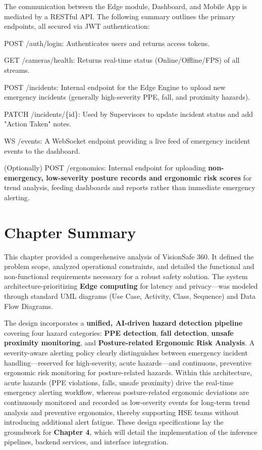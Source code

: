 The communication between the Edge module, Dashboard, and Mobile App is mediated by a RESTful API. The following summary outlines the primary endpoints, all secured via JWT authentication:

POST /auth/login: Authenticates users and returns access tokens.

GET /cameras/health: Returns real-time status (Online/Offline/FPS) of all streams.

POST /incidents: Internal endpoint for the Edge Engine to upload new emergency incidents (generally high-severity PPE, fall, and proximity hazards).

PATCH /incidents/\{id\}: Used by Supervisors to update incident status and add "Action Taken" notes.

WS /events: A WebSocket endpoint providing a live feed of emergency incident events to the dashboard.

(Optionally) POST /ergonomics: Internal endpoint for uploading \textbf{non-emergency, low-severity posture records and ergonomic risk scores} for trend analysis, feeding dashboards and reports rather than immediate emergency alerting.

\section{Chapter Summary}

This chapter provided a comprehensive analysis of VisionSafe 360. It defined the problem scope, analyzed operational constraints, and detailed the functional and non-functional requirements necessary for a robust safety solution. The system architecture-prioritizing \textbf{Edge computing} for latency and privacy—was modeled through standard UML diagrams (Use Case, Activity, Class, Sequence) and Data Flow Diagrams.

The design incorporates a \textbf{unified, AI-driven hazard detection pipeline} covering four hazard categories: \textbf{PPE detection}, \textbf{fall detection}, \textbf{unsafe proximity monitoring}, and \textbf{Posture-related Ergonomic Risk Analysis}. A severity-aware alerting policy clearly distinguishes between emergency incident handling—reserved for high-severity, acute hazards—and continuous, preventive ergonomic risk monitoring for posture-related hazards. Within this architecture, acute hazards (PPE violations, falls, unsafe proximity) drive the real-time emergency alerting workflow, whereas posture-related ergonomic deviations are continuously monitored and recorded as low-severity events for long-term trend analysis and preventive ergonomics, thereby supporting HSE teams without introducing additional alert fatigue. These design specifications lay the groundwork for \textbf{Chapter 4}, which will detail the implementation of the inference pipelines, backend services, and interface integration.
